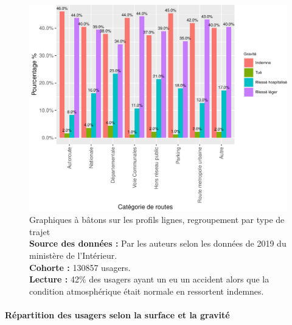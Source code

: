 \documentclass[french,]{tp}
\let\oldparagraph\paragraph
\renewcommand{\paragraph}[1]{\oldparagraph{#1}\mbox{}}
\begin{document}
\begin{figure}[ht!]

{\centering \includegraphics{Prediction_Gravite_files/figure-latex/barplotroute-1} 

}

\caption{Graphiques à bâtons sur les profils lignes, regroupement par type de trajet\\
\textbf{Source des données :} Par les auteurs selon les données de 2019 du ministère de l'Intérieur.\\
\textbf{Cohorte :} 130857 usagers.\\
\textbf{Lecture :} 42\% des usagers ayant un eu un accident alors que la condition atmosphérique était normale en ressortent indemnes.}\label{fig:barplotroute}
\end{figure}

\newpage

\hypertarget{ruxe9partition-des-usagers-selon-la-surface-et-la-gravituxe9}{%
\paragraph{Répartition des usagers selon la surface et la gravité}\label{ruxe9partition-des-usagers-selon-la-surface-et-la-gravituxe9}}
\end{document}
